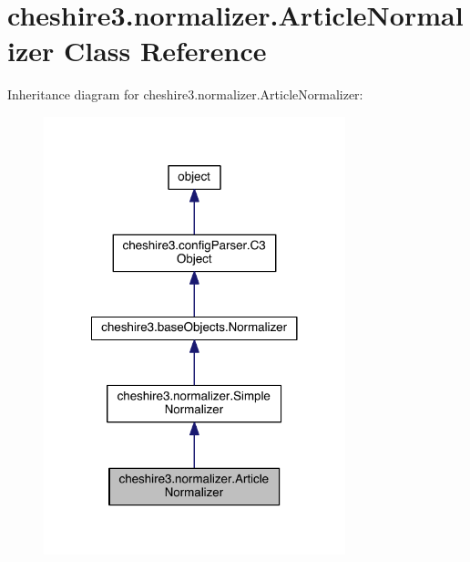 \hypertarget{classcheshire3_1_1normalizer_1_1_article_normalizer}{\section{cheshire3.\-normalizer.\-Article\-Normalizer Class Reference}
\label{classcheshire3_1_1normalizer_1_1_article_normalizer}
}


Inheritance diagram for cheshire3.\-normalizer.\-Article\-Normalizer\-:
\nopagebreak
\begin{figure}[H]
\begin{center}
\leavevmode
\includegraphics[width=248pt]{classcheshire3_1_1normalizer_1_1_article_normalizer__inherit__graph}
\end{center}
\end{figure}


